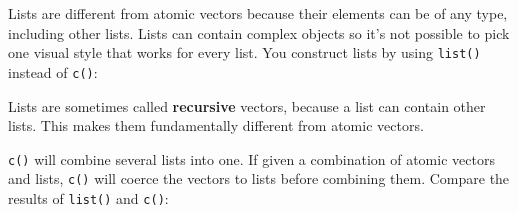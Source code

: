 \documentclass[]{book}
\newenvironment{Shaded}{\begin{snugshade}}{\end{snugshade}}
\newcommand{\CommentTok}[1]{\textcolor[rgb]{0.56,0.35,0.01}{\textit{#1}}}
\newcommand{\DecValTok}[1]{\textcolor[rgb]{0.00,0.00,0.81}{#1}}
\newcommand{\FloatTok}[1]{\textcolor[rgb]{0.00,0.00,0.81}{#1}}
\newcommand{\KeywordTok}[1]{\textcolor[rgb]{0.13,0.29,0.53}{\textbf{#1}}}
\newcommand{\NormalTok}[1]{#1}
\newcommand{\OperatorTok}[1]{\textcolor[rgb]{0.81,0.36,0.00}{\textbf{#1}}}
\newcommand{\OtherTok}[1]{\textcolor[rgb]{0.56,0.35,0.01}{#1}}
\newcommand{\StringTok}[1]{\textcolor[rgb]{0.31,0.60,0.02}{#1}}
\theoremstyle{definition}
\theoremstyle{definition}
\theoremstyle{definition}
\theoremstyle{remark}
\begin{document}
Lists are different from atomic vectors because their elements can be of
any type, including other lists. Lists can contain complex objects so
it's not possible to pick one visual style that works for every list.
You construct lists by using \texttt{list()} instead of \texttt{c()}:

\begin{Shaded}
\end{Shaded}

Lists are sometimes called \textbf{recursive} vectors, because a list
can contain other lists. This makes them fundamentally different from
atomic vectors.

\begin{Shaded}
\end{Shaded}

\texttt{c()} will combine several lists into one. If given a combination
of atomic vectors and lists, \texttt{c()} will coerce the vectors to
lists before combining them. Compare the results of \texttt{list()} and
\texttt{c()}:

\begin{Shaded}
\end{Shaded}
\end{document}
